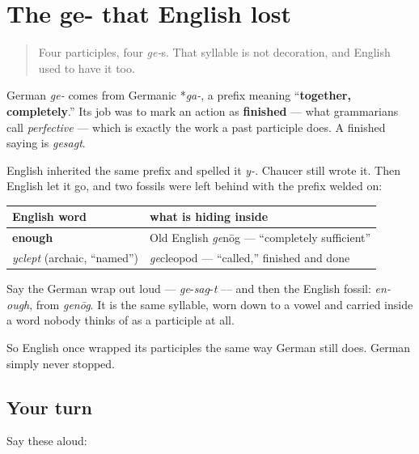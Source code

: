 \section[ge-]{The ge- that English lost}

\label{lesson:GE-C15-ge-praefix}



\begin{quote}
Four participles, four \emph{ge-}s. That syllable is not decoration, and English used to have it too.
\end{quote}

\begin{cousinweb}
German \emph{ge-} comes from Germanic *\emph{ga-}, a prefix meaning \textquotedblleft{}\textbf{together, completely}.\textquotedblright{} Its job was to mark an action as \textbf{finished} — what grammarians call \emph{perfective} — which is exactly the work a past participle does. A finished saying is \emph{gesagt}.

English inherited the same prefix and spelled it \emph{y-}. Chaucer still wrote it. Then English let it go, and two fossils were left behind with the prefix welded on:

\noindent
\begin{tabularx}{\linewidth}{@{}>{\raggedright\arraybackslash}X>{\raggedright\arraybackslash}X@{}}
\toprule
\textbf{English word} & \textbf{what is hiding inside} \\
\midrule
\textbf{enough} & Old English \emph{ge}nōg — \textquotedblleft{}completely sufficient\textquotedblright{} \\
\emph{yclept} (archaic, \textquotedblleft{}named\textquotedblright{}) & \emph{ge}cleopod — \textquotedblleft{}called,\textquotedblright{} finished and done \\
\bottomrule
\end{tabularx}

Say the German wrap out loud — \emph{ge}-\emph{sag}-\emph{t} — and then the English fossil: \emph{en-ough}, from \emph{genōg}. It is the same syllable, worn down to a vowel and carried inside a word nobody thinks of as a participle at all.

So English once wrapped its participles the same way German still does. German simply never stopped.
\end{cousinweb}

\subsection*{Your turn}
Say these aloud:

